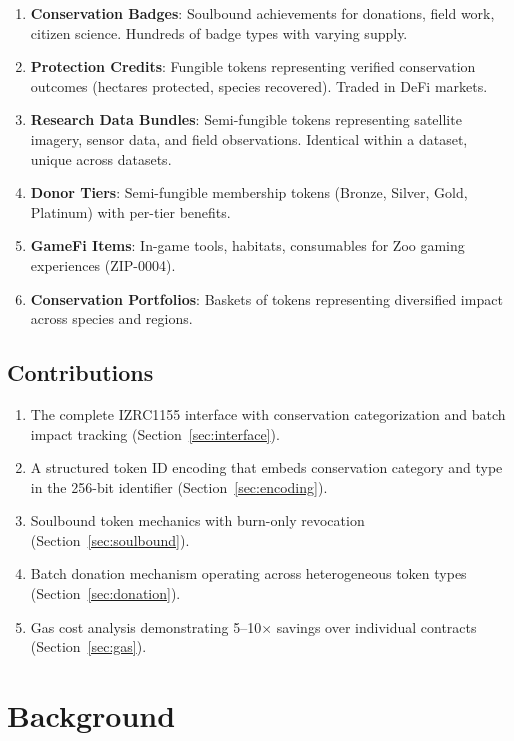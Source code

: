\documentclass[11pt,letterpaper]{article}
\begin{document}
\begin{enumerate}
    \item \textbf{Conservation Badges}: Soulbound achievements for donations, field work, citizen science. Hundreds of badge types with varying supply.
    \item \textbf{Protection Credits}: Fungible tokens representing verified conservation outcomes (hectares protected, species recovered). Traded in DeFi markets.
    \item \textbf{Research Data Bundles}: Semi-fungible tokens representing satellite imagery, sensor data, and field observations. Identical within a dataset, unique across datasets.
    \item \textbf{Donor Tiers}: Semi-fungible membership tokens (Bronze, Silver, Gold, Platinum) with per-tier benefits.
    \item \textbf{GameFi Items}: In-game tools, habitats, consumables for Zoo gaming experiences (ZIP-0004).
    \item \textbf{Conservation Portfolios}: Baskets of tokens representing diversified impact across species and regions.
\end{enumerate}

\subsection{Contributions}

\begin{enumerate}
    \item The complete IZRC1155 interface with conservation categorization and batch impact tracking (Section~\ref{sec:interface}).
    \item A structured token ID encoding that embeds conservation category and type in the 256-bit identifier (Section~\ref{sec:encoding}).
    \item Soulbound token mechanics with burn-only revocation (Section~\ref{sec:soulbound}).
    \item Batch donation mechanism operating across heterogeneous token types (Section~\ref{sec:donation}).
    \item Gas cost analysis demonstrating 5--10$\times$ savings over individual contracts (Section~\ref{sec:gas}).
\end{enumerate}

\section{Background}
\end{document}

